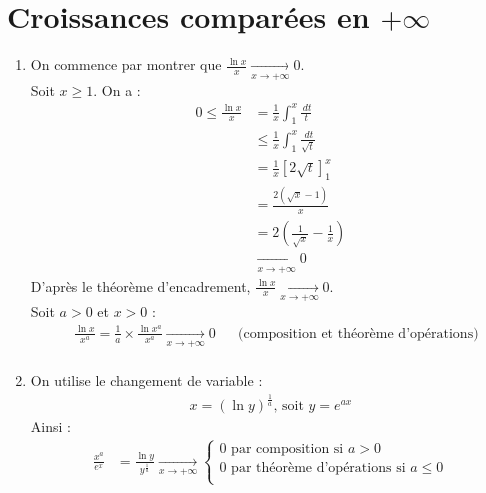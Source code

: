\documentclass[../main.tex]{subfiles}
\begin{document}
\setcounter{section}{20}
\section{Croissances comparées en $+\infty$}
\begin{enumerate}
    \item On commence par montrer que $\frac{\ln x}{x} \underset{x \to +\infty}{\longrightarrow} 0$. \\
    Soit $x \geq 1$. On a : 
    \begin{align*}
        0 \leq \frac{\ln x}{x} &= \frac{1}{x} \int_{1}^{x} \frac{\,dt}{t} \\
        &\leq \frac{1}{x} \int_{1}^{x} \frac{\,dt}{\sqrt{t}} \\
        &= \frac{1}{x} \left[ 2 \sqrt{t} \right]_{1}^{x} \\
        &= \frac{2(\sqrt{x} - 1)}{x} \\
        &= 2 \left( \frac{1}{\sqrt{x}} - \frac{1}{x} \right) \\
        &\underset{x \to +\infty}{\longrightarrow} 0 
    \end{align*}
    D'après le théorème d'encadrement, $\frac{\ln x}{x} \underset{x \to +\infty}{\longrightarrow} 0$. \\
    Soit $a > 0$ et $x > 0$ :
    \begin{align*}
        &\frac{\ln x}{x^a} = \frac{1}{a} \times \frac{\ln x^a}{x^a} \underset{x \to +\infty}{\longrightarrow} 0 && \text{(composition et théorème d'opérations)} \\
    \end{align*}

    \item On utilise le changement de variable : 
    \begin{align*}
        x = (\ln y)^{\frac{1}{a}} \text{, soit } y = e^{ax}
    \end{align*}
    Ainsi : 
    \begin{align*}
        \frac{x^a}{e^x} &= \frac{\ln y}{y^{\frac{1}{a}}} \underset{x \to +\infty}{\longrightarrow} 
        \begin{cases}
            0 \text{ par composition si } a > 0 \\
            0 \text{ par théorème d'opérations si } a \leq 0 \\
        \end{cases}
    \end{align*}
\end{enumerate}
\end{document}
